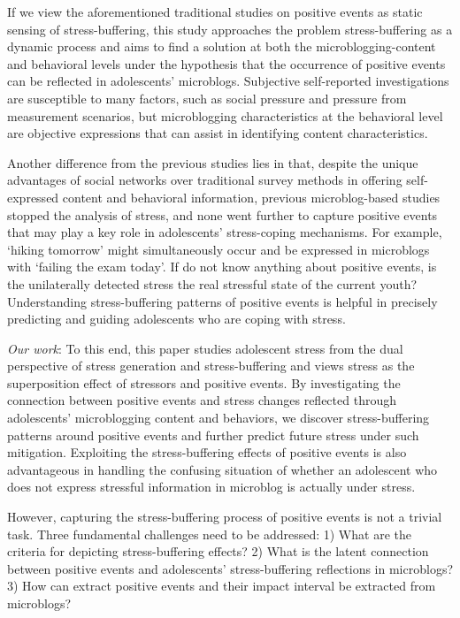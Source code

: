 \documentclass[5p,times,numbers,authoryear]{elsarticle}
\begin{document}
If we view the aforementioned traditional studies on positive events as static sensing of stress-buffering, this study approaches the problem stress-buffering as a dynamic process
and aims to find a solution at both the microblogging-content and behavioral levels under the hypothesis that the occurrence of positive events can be reflected in adolescents' microblogs.
Subjective self-reported investigations are susceptible to many factors,
such as 
{social pressure} 
and pressure from measurement scenarios, but
microblogging characteristics at the behavioral level are objective expressions that can assist in identifying content characteristics.

Another difference from the previous studies lies in that, despite the unique advantages of social networks over traditional survey methods in offering self-expressed content and behavioral information, previous microblog-based studies stopped the analysis of stress,
and none went further to capture positive events that may play a key role in adolescents' stress-coping mechanisms.
For example, `hiking tomorrow' might simultaneously occur and be expressed in microblogs with 
{`failing the exam today'.}
If do not know anything about positive events, is the unilaterally detected stress the real stressful state of the current youth?
Understanding stress-buffering patterns of positive events is helpful in precisely predicting and guiding adolescents who are coping with stress.

\emph{Our work}:
To this end, this paper studies adolescent stress from the dual perspective of stress generation and stress-buffering and views stress as the superposition effect of stressors and positive events.
By investigating the connection between positive events and stress changes
reflected through adolescents' microblogging content and behaviors, we discover stress-buffering patterns around positive events and further predict future stress under such mitigation.
Exploiting the stress-buffering effects of positive events is also advantageous in handling the confusing situation of whether an adolescent who does not express stressful information in microblog is actually under stress.

However, capturing the stress-buffering process of positive events is not a trivial task.
Three fundamental challenges need to be addressed:
1) What are the criteria for depicting 
{stress-buffering effects?}
2) What is the latent connection between positive events and adolescents' stress-buffering reflections in microblogs?
3) How  can extract positive events and their impact interval be extracted from microblogs?
\end{document}
